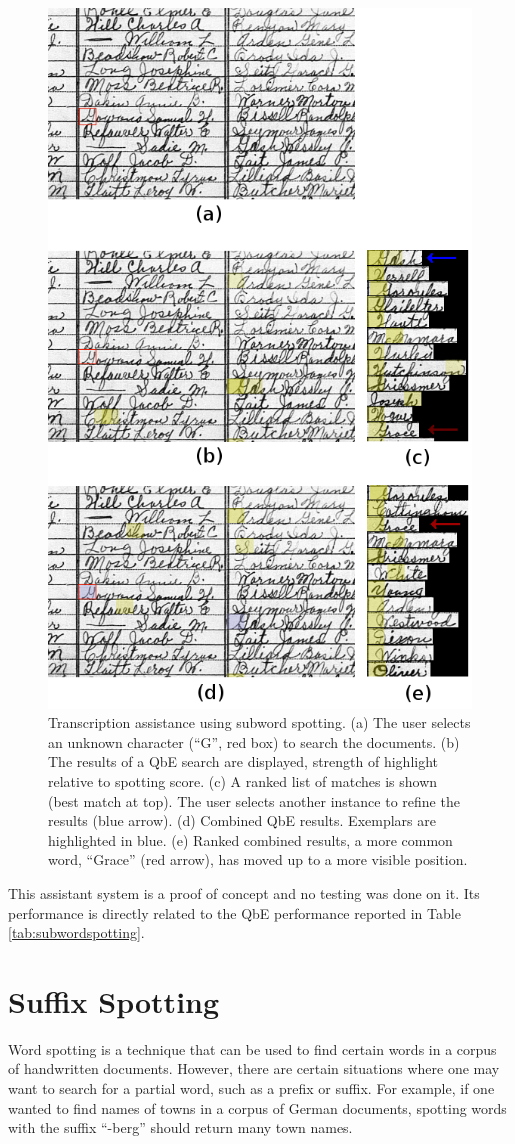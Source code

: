 \documentclass[ms,electronic,twosidetoc,letterpaper,chaptercenter,parttop,lof,lot]{byumsphd}
\begin{document}
\begin{figure}
    \centering
    \includegraphics[width=.65\textwidth]{assist_demo}
    \caption{Transcription assistance using subword spotting. (a) The user selects an unknown character (``G'', red box) to search the documents. (b) The results of a QbE search are displayed, strength of highlight relative to spotting score. (c) A ranked list of matches is shown (best match at top). The user selects another instance to refine the results (blue arrow). (d) Combined QbE results. Exemplars are highlighted in blue. (e) Ranked combined results, a more common word, ``Grace'' (red arrow), has moved up to a more visible position.}
    \label{fig:assist_demo}
\end{figure}

This assistant system is a proof of concept and no testing was done on it. Its performance is directly related to the QbE performance reported in Table \ref{tab:subwordspotting}.


\section{Suffix Spotting}
Word spotting is a technique that can be used to find certain words in a corpus of handwritten documents. However, there are certain situations where one may want to search for a partial word, such as a prefix or suffix. For example, if one wanted to find names of towns in a corpus of German documents, spotting words with the suffix ``-berg'' should return many town names.
\end{document}
